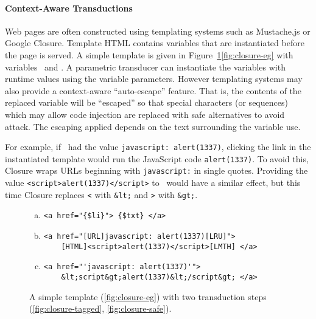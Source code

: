 
\paragraph{Context-Aware Transductions}

Web pages are often constructed using templating systems such as Mustache.js or Google Closure.
Template HTML contains variables that are instantiated before the page is served.
A simple template is given in Figure~\ref{fig:closure}\ref{fig:closure-eg} with variables \linkvar\ and \linktextvar.
A parametric transducer can instantiate the variables with runtime values using the variable parameters.
However templating systems may also provide a context-aware ``auto-escape'' feature.
That is, the contents of the replaced variable will be ``escaped'' so that special characters (or sequences) which may allow code injection are replaced with safe alternatives to avoid attack.
The escaping applied depends on the text surrounding the variable use.

For example, if \linkvar\ had the value \texttt{javascript: alert(1337)}, clicking the link in the instantiated template would run the JavaScript code \texttt{alert(1337)}.
To avoid this, Closure wraps URLs beginning with \texttt{javascript:} in single quotes.
Providing the value \texttt{<script>alert(1337)</script>} to \linktextvar\ would have a similar effect, but this time Closure replaces \texttt{<} with \texttt{\&lt;} and \texttt{>} with \texttt{\&gt;}.

\begin{figure}
\begin{center}
\begin{minipage}{.75\linewidth}
\begin{enumerate}[(a)]
\item \label{fig:closure-eg}
\begin{verbatim}
<a href="{$li}"> {$txt} </a>
\end{verbatim}
\item \label{fig:closure-tagged}
\begin{verbatim}
<a href="[URL]javascript: alert(1337)[LRU]">
    [HTML]<script>alert(1337)</script>[LMTH] </a>
\end{verbatim}
\item \label{fig:closure-safe}
\begin{verbatim}
<a href="'javascript: alert(1337)'">
    &lt;script&gt;alert(1337)&lt;/script&gt; </a>
\end{verbatim}
\end{enumerate}
\end{minipage}
\end{center}
\vspace{-3ex}
\caption{\label{fig:closure}A simple template (\ref{fig:closure-eg}) with two transduction steps (\ref{fig:closure-tagged}, \ref{fig:closure-safe}).}
\end{figure}

